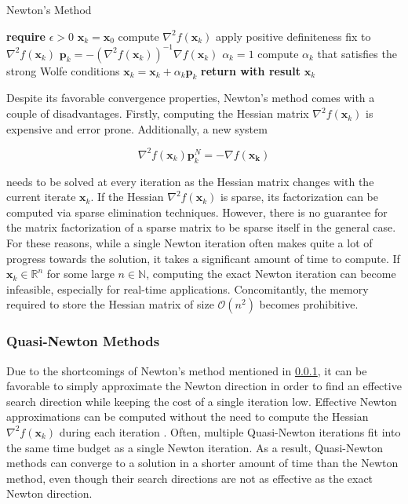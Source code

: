 \begin{algorithm}
\caption{Newton's Method}\label{alg:newton-method}
\begin{algorithmic}
\State \textbf{require } $\epsilon > 0$
\State $\bm{x}_k = \bm{x}_0$
\State compute $\nabla^2 f(\bm{x}_k)$
\State apply positive definiteness fix to $\nabla^2 f(\bm{x}_k)$
\EndIf
\State $\bm{p}_k = -(\nabla^2 f(\bm{x}_k))^{-1} \nabla f(\bm{x}_k)$
\State $\alpha_k = 1$
\State compute $\alpha_k$ that satisfies the strong Wolfe conditions
\EndIf
\State $\bm{x}_k = \bm{x}_k + \alpha_k \bm{p}_k$
\EndWhile
\State \textbf{return with result } $\bm{x}_k$
\EndProcedure
\end{algorithmic}
\end{algorithm}

Despite its favorable convergence properties, Newton's method comes with a couple of disadvantages. Firstly, computing the Hessian matrix
$\nabla^2 f(\bm{x}_k)$ is expensive and error prone. Additionally, a new system 

\[
    \nabla^2 f(\bm{x}_k) \bm{p}^N_k = - \nabla f(\bm{x_k})
\]

\noindent needs to be solved at every iteration as the Hessian matrix changes with the current iterate $\bm{x}_k$.
If the Hessian $\nabla^2 f(\bm{x}_k)$ is sparse, its factorization can be computed via sparse elimination techniques. However, there is no
guarantee for the matrix factorization of a sparse matrix to be sparse itself in the general case.
For these reasons, while a single
Newton iteration often makes quite a lot of progress towards the solution, it takes a significant amount of time to compute. If $\bm{x}_k
\in \mathbb{R}^n$ for some large $n \in \mathbb{N}$, computing the exact Newton iteration can become infeasible, especially for real-time
applications. Concomitantly, the memory required to store the Hessian matrix of size $\mathcal{O}(n^2)$ becomes prohibitive.

\subsubsection{Quasi-Newton Methods}\label{sss:quasi-newton}
Due to the shortcomings of Newton's method mentioned in \cref{sss:quasi-newton}, it can be favorable to simply approximate the Newton 
direction
in order to find an effective search direction while keeping the cost of a single iteration low. Effective Newton approximations can be 
computed without the need to compute the Hessian $\nabla^2 f(\bm{x}_k)$ during each iteration \cite{nocedal2006}. Often, multiple Quasi-Newton 
iterations fit into the same time budget as a single Newton iteration. As a result, Quasi-Newton methods can converge to a solution in a 
shorter amount of time than the Newton method, even though their search directions are not as effective as the exact Newton direction.

